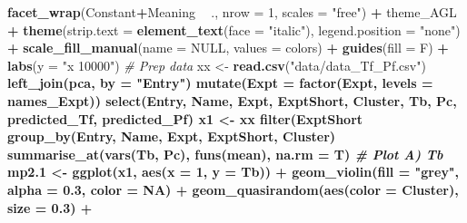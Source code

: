 \documentclass[
]{article}
\newenvironment{Shaded}{\begin{snugshade}}{\end{snugshade}}
\newcommand{\CommentTok}[1]{\textcolor[rgb]{0.56,0.35,0.01}{\textit{#1}}}
\newcommand{\DataTypeTok}[1]{\textcolor[rgb]{0.13,0.29,0.53}{#1}}
\newcommand{\DecValTok}[1]{\textcolor[rgb]{0.00,0.00,0.81}{#1}}
\newcommand{\FloatTok}[1]{\textcolor[rgb]{0.00,0.00,0.81}{#1}}
\newcommand{\KeywordTok}[1]{\textcolor[rgb]{0.13,0.29,0.53}{\textbf{#1}}}
\newcommand{\NormalTok}[1]{#1}
\newcommand{\OperatorTok}[1]{\textcolor[rgb]{0.81,0.36,0.00}{\textbf{#1}}}
\newcommand{\OtherTok}[1]{\textcolor[rgb]{0.56,0.35,0.01}{#1}}
\newcommand{\StringTok}[1]{\textcolor[rgb]{0.31,0.60,0.02}{#1}}
\begin{document}
\begin{Shaded}
\begin{Highlighting}[]
{{{{{{\StringTok{  }\KeywordTok{facet_wrap}\NormalTok{(Constant}\OperatorTok{+}\NormalTok{Meaning }\OperatorTok{~}\StringTok{ }\NormalTok{., }\DataTypeTok{nrow =} \DecValTok{1}\NormalTok{, }\DataTypeTok{scales =} \StringTok{"free"}\NormalTok{) }\OperatorTok{+}\StringTok{ }
\StringTok{  }\NormalTok{theme_AGL }\OperatorTok{+}
\StringTok{  }\KeywordTok{theme}\NormalTok{(}\DataTypeTok{strip.text =} \KeywordTok{element_text}\NormalTok{(}\DataTypeTok{face =} \StringTok{"italic"}\NormalTok{),}
        \DataTypeTok{legend.position =} \StringTok{"none"}\NormalTok{) }\OperatorTok{+}
\StringTok{  }\KeywordTok{scale_fill_manual}\NormalTok{(}\DataTypeTok{name =} \OtherTok{NULL}\NormalTok{, }\DataTypeTok{values =}\NormalTok{ colors) }\OperatorTok{+}
\StringTok{  }\KeywordTok{guides}\NormalTok{(}\DataTypeTok{fill =}\NormalTok{ F) }\OperatorTok{+}
\StringTok{  }\KeywordTok{labs}\NormalTok{(}\DataTypeTok{y =} \StringTok{"x 10000"}\NormalTok{)}
\CommentTok{# Prep data}
\NormalTok{xx <-}\StringTok{ }\KeywordTok{read.csv}\NormalTok{(}\StringTok{"data/data_Tf_Pf.csv"}\NormalTok{) }\OperatorTok{%
\StringTok{  }\KeywordTok{left_join}\NormalTok{(pca, }\DataTypeTok{by =} \StringTok{"Entry"}\NormalTok{) }\OperatorTok{%
\StringTok{  }\KeywordTok{mutate}\NormalTok{(}\DataTypeTok{Expt =} \KeywordTok{factor}\NormalTok{(Expt, }\DataTypeTok{levels =}\NormalTok{ names_Expt)) }\OperatorTok{%
\StringTok{  }\KeywordTok{select}\NormalTok{(Entry, Name, Expt, ExptShort, Cluster, Tb, Pc, predicted_Tf, predicted_Pf)}
\NormalTok{x1 <-}\StringTok{ }\NormalTok{xx }\OperatorTok{%
\StringTok{  }\KeywordTok{filter}\NormalTok{(ExptShort }\OperatorTok{%
\StringTok{  }\KeywordTok{group_by}\NormalTok{(Entry, Name, Expt, ExptShort, Cluster) }\OperatorTok{%
\StringTok{  }\KeywordTok{summarise_at}\NormalTok{(}\KeywordTok{vars}\NormalTok{(Tb, Pc), }\KeywordTok{funs}\NormalTok{(mean), }\DataTypeTok{na.rm =}\NormalTok{ T) }
\CommentTok{# Plot A) Tb}
\NormalTok{mp2}\FloatTok{.1}\NormalTok{ <-}\StringTok{ }\KeywordTok{ggplot}\NormalTok{(x1, }\KeywordTok{aes}\NormalTok{(}\DataTypeTok{x =} \DecValTok{1}\NormalTok{, }\DataTypeTok{y =}\NormalTok{ Tb)) }\OperatorTok{+}\StringTok{ }
\StringTok{  }\KeywordTok{geom_violin}\NormalTok{(}\DataTypeTok{fill =} \StringTok{"grey"}\NormalTok{, }\DataTypeTok{alpha =} \FloatTok{0.3}\NormalTok{, }\DataTypeTok{color =} \OtherTok{NA}\NormalTok{) }\OperatorTok{+}\StringTok{ }
\StringTok{  }\KeywordTok{geom_quasirandom}\NormalTok{(}\KeywordTok{aes}\NormalTok{(}\DataTypeTok{color =}\NormalTok{ Cluster), }\DataTypeTok{size =} \FloatTok{0.3}\NormalTok{) }\OperatorTok{+}\StringTok{ }
}}}}}}}}}}}}
\end{Highlighting}
\end{Shaded}
\end{document}
